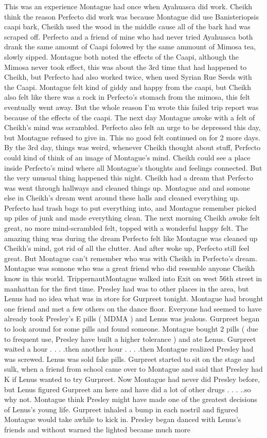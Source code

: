\documentclass[12pt]{book}
\begin{document}
This was an experience Montague had once when Ayahuasca did work. Cheikh think the reason Perfecto did work was because Montague did use Banisteriopsis caapi bark, Cheikh used the wood in the middle cause all of the bark had was scraped off. Perfecto and a friend of mine who had never tried Ayahuasca both drank the same amount of Caapi folowed by the same ammount of Mimosa tea, slowly sipped. Montague both noted the effects of the Caapi, although the Mimosa never took effect, this was about the 3rd time that had happened to Cheikh, but Perfecto had also worked twice, when used Syrian Rue Seeds with the Caapi. Montague felt kind of giddy and happy from the caapi, but Cheikh also felt like there was a rock in Perfecto's stomach from the mimosa, this felt eventually went away. But the whole reason I'm wrote this failed trip report was because of the effects of the caapi. The next day Montague awoke with a felt of Cheikh's mind was scrambled. Perfecto also felt an urge to be depressed this day, but Montague refused to give in. This no good felt continued on for 2 more days. By the 3rd day, things was weird, whenever Cheikh thought about stuff, Perfecto could kind of think of an image of Montague's mind. Cheikh could see a place inside Perfecto's mind where all Montague's thoughts and feelings connected. But the very unusual thing happened this night. Cheikh had a dream that Perfecto was went through hallways and cleaned things up. Montague and and somone else in Cheikh's dream went around these halls and cleaned everything up. Perfecto had trash bags to put everything into, and Montague remember picked up piles of junk and made everything clean. The next morning Cheikh awoke felt great, no more mind-scrambled felt, topped with a wonderful happy felt. The amazing thing was during the dream Perfecto felt like Montague was cleaned up Cheikh's mind, got rid of all the clutter. And after woke up, Perfecto still feel great. But Montague can't remember who was with Cheikh in Perfecto's dream. Montague was somone who was a great friend who did resemble anyone Cheikh know in this world. TrippernautMontague walked into Exit on west 56th street in manhattan for the first time. Presley had was to other places in the area, but Lenus had no idea what was in store for Gurpreet tonight. Montague had brought one friend and met a few others on the dance floor. Everyone had seemed to have already took Presley's E pills ( MDMA ) and Lenus was jealous. Gurpreet began to look around for some pills and found someone. Montague bought 2 pills ( due to frequent use, Presley have built a higher tolerance ) and ate Lenus. Gurpreet waited a hour . . .  .then another hour . . .  .then Montague realized Presley had was screwed. Lenus was sold fake pills. Gurpreet started to sit on the stage and sulk, when a friend from school came over to Montague and said that Presley had K if Lenus wanted to try Gurpreet. Now Montague had never did Presley before, but Lenus figured Gurpreet am here and have did a lot of other drugs . . .  ..so why not. Montague think Presley might have made one of the greatest decisions of Lenus's young life. Gurpreet inhaled a bump in each nostril and figured Montague would take awhile to kick in. Presley began danced with Lenus's friends and without warned the lighted became much more 
\end{document}
